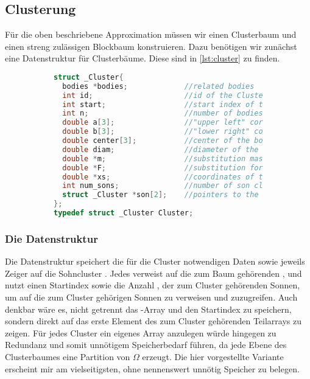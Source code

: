     \subsection{Clusterung}
    Für die oben beschriebene Approximation müssen wir einen Clusterbaum und einen streng zulässigen Blockbaum konstruieren.
    Dazu benötigen wir zunächst eine Datenstruktur für Clusterbäume. Diese sind in \autoref{lst:cluster} zu finden.
    \begin{figure}[tb]
    \begin{subfigure}{0.9\textwidth}
    \begin{lstlisting}[language=C, label=lst:cluster, caption={Die Struktur \code{Cluster} vereint die Definition eines Clusters mit der eines Clusterbaumes.}, numbers=none]
struct _Cluster{
  bodies *bodies;             //related bodies
  int id;                     //id of the Cluster
  int start;                  //start index of the according subarray
  int n;                      //number of bodies in this Cluster
  double a[3];                //"upper left" corner of the bounding box
  double b[3];                //"lower right" corner of the bounding box
  double center[3];           //center of the bounding box
  double diam;                //diameter of the bounding box
  double *m;                  //substitution masses
  double *F;                  //substitution forces
  double *xs;                 //coordinates of the locations of submasses
  int num_sons;               //number of son clusters
  struct _Cluster *son[2];    //pointers to the son
};
typedef struct _Cluster Cluster;
    \end{lstlisting}
    \end{subfigure}
    \end{figure}
    
    \subsubsection{Die Datenstruktur}
    Die Datenstruktur speichert die für die Cluster notwendigen Daten sowie jeweils Zeiger auf die Sohncluster . Jedes  verweist auf die zum Baum gehörenden 
    , und nutzt einen Startindex  sowie die Anzahl , der zum Cluster gehörenden Sonnen, um auf die zum Cluster gehörigen Sonnen zu verweisen und
    zuzugreifen. Auch denkbar wäre es, nicht getrennt das -Array und den Startindex zu speichern, sondern direkt auf das erste Element des zum Cluster gehörenden Teilarrays zu zeigen. Für jedes Cluster ein eigenes
    Array anzulegen würde hingegen zu Redundanz und somit unnötigem Speicherbedarf führen, da jede Ebene des Clusterbaumes eine Partition von $\Omega$ erzeugt. Die hier vorgestellte Variante
    erscheint mir am vielseitigsten, ohne nennenswert unnötig Speicher zu belegen.
    

